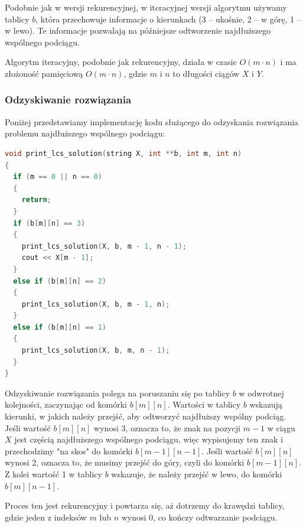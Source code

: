 \documentclass{article}
\begin{document}
Podobnie jak w wersji rekurencyjnej, w iteracyjnej wersji algorytmu używamy tablicy $b$, która przechowuje informacje o kierunkach (3 – ukośnie, 2 – w górę, 1 – w lewo). Te informacje pozwalają na późniejsze odtworzenie najdłuższego wspólnego podciągu.

Algorytm iteracyjny, podobnie jak rekurencyjny, działa w czasie $O(m \cdot n)$ i ma złożoność pamięciową $O(m \cdot n)$, gdzie $m$ i $n$ to długości ciągów $X$ i $Y$.
\subsubsection{Odzyskiwanie rozwiązania}
Poniżej przedstawiamy implementację kodu służącego do odzyskania rozwiązania problemu najdłuższego wspólnego podciągu:
\begin{lstlisting}[style=mystyle, language=C++, caption={Implementacja \texttt{print\_lcs\_solution}}, label={lst:print_lcs_solution}]
void print_lcs_solution(string X, int **b, int m, int n)
{
  if (m == 0 || n == 0)
  {
    return;
  }
  if (b[m][n] == 3)
  {
    print_lcs_solution(X, b, m - 1, n - 1);
    cout << X[m - 1];
  }
  else if (b[m][n] == 2)
  {
    print_lcs_solution(X, b, m - 1, n);
  }
  else if (b[m][n] == 1)
  {
    print_lcs_solution(X, b, m, n - 1);
  }
}
\end{lstlisting}
Odzyskiwanie rozwiązania polega na poruszaniu się po tablicy $b$ w odwrotnej kolejności, zaczynając od komórki $b[m][n]$. Wartości w tablicy $b$ wskazują kierunki, w jakich należy przejść, aby odtworzyć najdłuższy wspólny podciąg. Jeśli wartość $b[m][n]$ wynosi 3, oznacza to, że znak na pozycji $m-1$ w ciągu $X$ jest częścią najdłuższego wspólnego podciągu, więc wypisujemy ten znak i przechodzimy "na skos" do komórki $b[m-1][n-1]$. Jeśli wartość $b[m][n]$ wynosi 2, oznacza to, że musimy przejść do góry, czyli do komórki $b[m-1][n]$. Z kolei wartość 1 w tablicy $b$ wskazuje, że należy przejść w lewo, do komórki $b[m][n-1]$. 

Proces ten jest rekurencyjny i powtarza się, aż dotrzemy do krawędzi tablicy, gdzie jeden z indeksów $m$ lub $n$ wynosi 0, co kończy odtwarzanie podciągu.
\end{document}
